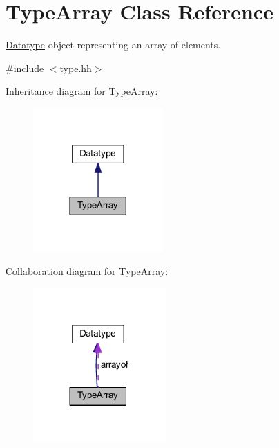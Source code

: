 \hypertarget{class_type_array}{}\section{Type\+Array Class Reference}
\label{class_type_array}


\mbox{\hyperlink{class_datatype}{Datatype}} object representing an array of elements.  




{\ttfamily \#include $<$type.\+hh$>$}



Inheritance diagram for Type\+Array\+:
\nopagebreak
\begin{figure}[H]
\begin{center}
\leavevmode
\includegraphics[width=141pt]{class_type_array__inherit__graph}
\end{center}
\end{figure}


Collaboration diagram for Type\+Array\+:
\nopagebreak
\begin{figure}[H]
\begin{center}
\leavevmode
\includegraphics[width=144pt]{class_type_array__coll__graph}
\end{center}
\end{figure}
